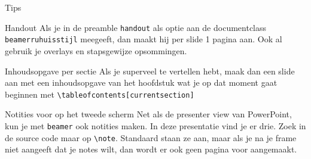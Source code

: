 \documentclass[department=hlcs, notes={hide notes}, slidesperpage=4, handout, official=true]{beamerruhuisstijl}
\begin{document}
\begin{frame}{Tips}
    \begin{block}{Handout}
        Als je in de preamble \texttt{handout} als optie aan de documentclass \texttt{beamerruhuisstijl} meegeeft, dan maakt hij per slide 1 pagina aan. Ook al gebruik je overlays en stapsgewijze opsommingen.
    \end{block}

    \begin{block}{Inhoudsopgave per sectie}
        Als je superveel te vertellen hebt, maak dan een slide aan met een inhoudsopgave van het hoofdstuk wat je op dat moment gaat beginnen met \texttt{\textbackslash tableofcontents[currentsection]}
    \end{block}

    \begin{block}{Notities voor op het tweede scherm}
        Net als de presenter view van PowerPoint, kun je met \texttt{beamer} ook notities maken. In deze presentatie vind je er drie. Zoek in de source code maar op \texttt{\textbackslash note}. Standaard staan ze aan, maar als je na je frame niet aangeeft dat je notes wilt, dan wordt er ook geen pagina voor aangemaakt. 
    \end{block}
\end{frame}
\end{document}
